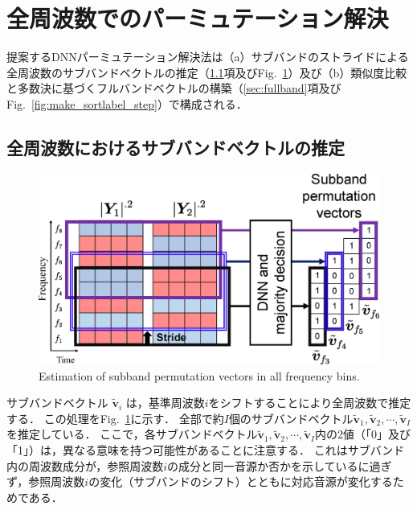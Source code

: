 \section{全周波数でのパーミュテーション解決}
\label{sec:Fullband}
提案するDNNパーミュテーション解決法は（a）サブバンドのストライドによる全周波数のサブバンドベクトルの推定（\ref{sec:pred}項及びFig.~\ref{fig:estimate_allfreq_labels}）及び（b）類似度比較と多数決に基づくフルバンドベクトルの構築（\ref{sec:fullband}項及び Fig.~\ref{fig:make_sortlabel_step}）で構成される．

\subsection{全周波数におけるサブバンドベクトルの推定}
\label{sec:pred}
\begin{figure}[t]
    \begin{center}
        \includegraphics[width=0.9\columnwidth]{figures/estimate_allfreq_labels.eps}
    \end{center}
    \vspace{-15pt}
	\caption{Estimation of subband permutation vectors in all frequency bins.}
	\label{fig:estimate_allfreq_labels}
	\vspace{-8pt}   %
\end{figure}
サブバンドベクトル $\tilde{\bm{v}}_i$ は，基準周波数$i$をシフトすることにより全周波数で推定する．
この処理をFig.~\ref{fig:estimate_allfreq_labels}に示す．
全部で約$I$個のサブバンドベクトル$\tilde{\bm{v}}_1, \tilde{\bm{v}}_2, \cdots, \tilde{\bm{v}}_I$を推定している．
ここで，各サブバンドベクトル$\tilde{\bm{v}}_1, \tilde{\bm{v}}_2, \cdots, \tilde{\bm{v}}_I$内の2値（「0」及び「1」）は，異なる意味を持つ可能性があることに注意する．
これはサブバンド内の周波数成分が，参照周波数$i$の成分と同一音源か否かを示しているに過ぎず，参照周波数$i$の変化（サブバンドのシフト）とともに対応音源が変化するためである．

